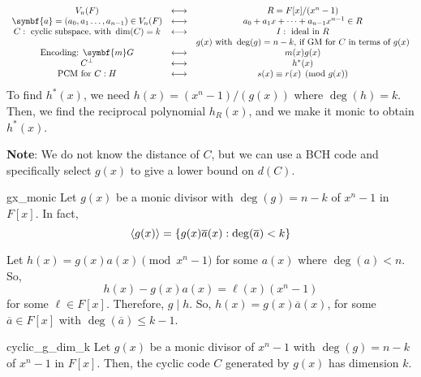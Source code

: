 
\[
    \begin{array}{ccc}
        V_n(F)                                       & \longleftrightarrow & R=F[x]/(x^n-1)                      \\
        \symbf{a}=(a_0,a_1\ldots ,a_{n-1})\in V_n(F) & \longleftrightarrow & a_0+a_1x+\cdots+a_{n-1}x^{n-1}\in R \\
        C: \text{ cyclic subspace, with } \dim(C)=k  & \longleftrightarrow & I:\text{ ideal in } R               \\
                                                     &                     & g(x) \text{ with } \deg(g)=n-k
        \text{, if GM for $ C $ in terms of $ g(x)$}                                                             \\
        \text{Encoding: $ \symbf{m}G $}              & \longleftrightarrow & m(x)g(x)                            \\
        C^{\perp}                                    & \longleftrightarrow & h^*(x)                              \\
        \text{PCM for } C: H                         & \longleftrightarrow & s(x)\equiv r(x)\pmod{g(x)}
    \end{array}
\]
To find $ h^*(x) $, we need $ h(x)=(x^n-1)/(g(x)) $ where $ \deg(h)=k $. Then,
we find the reciprocal polynomial $ h_R(x) $, and we make it monic to obtain
$ h^*(x) $.

\textbf{Note}: We do not know the distance of $ C $, but we can use a BCH
code and specifically select $ g(x) $ to give a lower bound on
$ d(C) $.

\begin{Lemma}{}{gx_monic}
    Let $ g(x) $ be a monic divisor with $ \deg(g)=n-k $ of
    $ x^n-1 $ in $ F[x] $. In fact,
    \[ \langle g(x) \rangle = \{g(x)\overline{a}(x):\deg(\overline{a})<k\} \]
\end{Lemma}

\begin{Proof}{}{}
    Let $ h(x)=g(x)a(x)\pmod{x^n-1} $ for some $ a(x) $ where $ \deg(a)<n $. So,
    \[ h(x)-g(x)a(x)=\ell(x)(x^n-1) \]
    for some $ \ell \in F[x] $. Therefore, $ g\mid h $.
    So, $ h(x)=g(x)\overline{a}(x) $, for some $ \overline{a}\in F[x] $
    with $ \deg(\overline{a})\leqslant k-1 $.
\end{Proof}

\begin{Theorem}{}{cyclic_g_dim_k}
    Let $ g(x) $ be a monic divisor of $ x^n-1 $ with $ \deg(g)=n-k $ of
    $ x^n-1 $ in $ F[x] $. Then, the cyclic code $ C $ generated
    by $ g(x) $ has dimension $ k $.
\end{Theorem}

